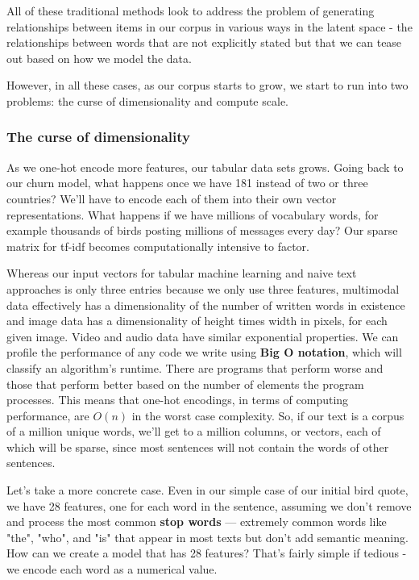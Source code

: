 \documentclass[11pt, table]{diazessay} %
\begin{document}
\begin{sloppypar}
 All of these traditional methods look to address the problem of generating relationships between items in our corpus in various ways in the latent space - the relationships between words that are not explicitly stated but that we can tease out based on how we model the data.
 
 However, in all these cases, as our corpus starts to grow, we start to run into two problems: the curse of dimensionality and compute scale.
 
 \subsubsection{The curse of dimensionality}

As we one-hot encode more features, our tabular data sets grows. Going back to our churn model,  what happens once we have 181 instead of two or three countries? We'll have to encode each of them  into their own vector representations. What happens if we have millions of vocabulary words, for example thousands of birds posting millions of messages every day? Our sparse matrix for tf-idf becomes computationally intensive to factor.

Whereas our input vectors for tabular machine learning and naive text approaches is only three entries because we only use three features, multimodal data effectively has a dimensionality of the number of written words in existence and image data has a dimensionality of height times width in pixels, for each given image. Video and audio data have similar exponential properties.  We can profile the performance of any code we write using \textbf{Big O notation}, which will classify an algorithm's runtime.  There are programs that perform worse and those that perform better based on the number of elements the program processes. This means that one-hot encodings, in terms of computing performance, are \begin{math}O(n)\end{math} in the worst case complexity. So, if our text is a corpus of a million unique words, we'll get to a million columns, or vectors, each of which will be sparse, since most sentences will not contain the words of other sentences.   

Let's take a more concrete case. Even in our simple case of our initial bird quote, we have 28 features, one for each word in the sentence, assuming we don't remove and process the most common \textbf{stop words} --- extremely common words like "the", "who", and "is" that appear in most texts but don't add semantic meaning.  How can we create a model that has 28 features? That's fairly simple if tedious - we encode each word as a numerical value.


\end{sloppypar}
\end{document}
